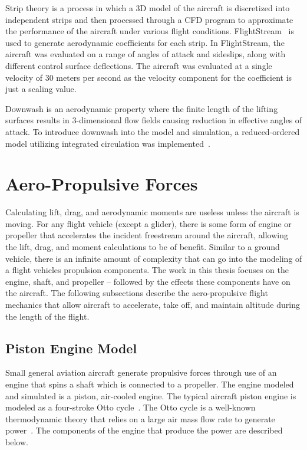 Strip theory is a process in which a 3D model of the aircraft is discretized into independent strips and then processed through a CFD program to approximate the performance of the aircraft under various flight conditions. FlightStream~\cite{FlightStream2022} is used to generate aerodynamic coefficients for each strip. In FlightStream, the aircraft was evaluated on a range of angles of attack and sideslips, along with different control surface deflections. The aircraft was evaluated at a single velocity of 30 meters per second as the velocity component for the coefficient is just a scaling value.

Downwash is an aerodynamic property where the finite length of the lifting surfaces results in 3-dimensional flow fields causing reduction in effective angles of attack. To introduce downwash into the model and simulation, a reduced-ordered model utilizing integrated circulation was implemented~\cite{ahujaIntegratedComputationalAeroacoustics2022,bhandariGeneticAlgorithmOptimization2023}\@.

\section{\textbf{Aero-Propulsive Forces}}

Calculating lift, drag, and aerodynamic moments are useless unless the aircraft is moving. For any flight vehicle (except a glider), there is some form of engine or propeller that accelerates the incident freestream around the aircraft, allowing the lift, drag, and moment calculations to be of benefit. Similar to a ground vehicle, there is an infinite amount of complexity that can go into the modeling of a flight vehicles propulsion components. The work in this thesis focuses on the engine, shaft, and propeller {--} followed by the effects these components have on the aircraft. The following subsections describe the aero-propulsive flight mechanics that allow aircraft to accelerate, take off, and maintain altitude during the length of the flight.

\subsection{\textbf{Piston Engine Model}}
Small general aviation aircraft generate propulsive forces through use of an engine that spins a shaft which is connected to a propeller. The engine modeled and simulated is a piston, air-cooled engine. The typical aircraft piston engine is modeled as a four-stroke Otto cycle~\cite{raymerAircraftDesignConceptual2018}. The Otto cycle is a well-known thermodynamic theory that relies on a large air mass flow rate to generate power~\cite{gudmundssonGeneralAviationAircraft2014}. The components of the engine that produce the power are described below.

